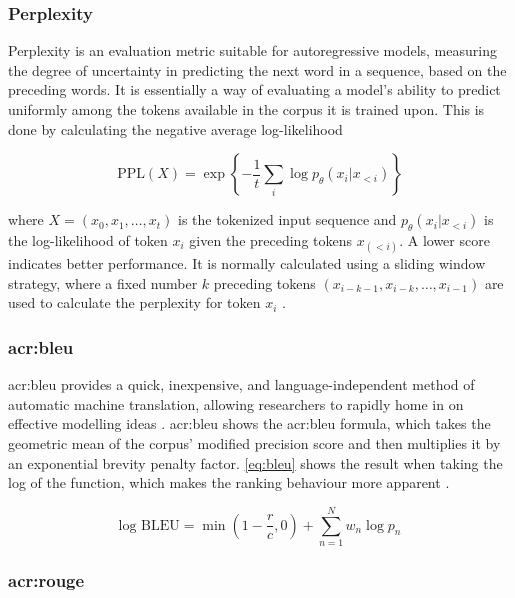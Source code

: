 \subsubsection{Perplexity}

Perplexity is an evaluation metric suitable for autoregressive models, measuring the degree of uncertainty in predicting the next word in a sequence, based on the preceding words. It is essentially a way of evaluating a model's ability to predict uniformly among the tokens available in the corpus it is trained upon. This is done by calculating the negative average log-likelihood

\begin{equation}
    \text{PPL}(X) = \exp \left\{ -\frac{1}{t} \sum_{i} \log p_\theta(x_i | x_{<i}) \right\}
    \label{eq:ppl}
\end{equation}

\noindent where $X = (x_0, x_1, \ldots, x_t)$ is the tokenized input sequence and $p_\theta(x_i | x_{<i})$ is the log-likelihood of token $x_i$ given the preceding tokens $x_(<i)$. A lower score indicates better performance. It is normally calculated using a sliding window strategy, where a fixed number $k$ preceding tokens $(x_{i-k-1},x_{i-k},\ldots,x_{i-1})$ are used to calculate the perplexity for token $x_i$ \citep{huggingfacePerplexityFixedlengthModels}.

\subsubsection[BiLingual Evaluation Understudy]{\acrfull{acr:bleu}}

\gls{acr:bleu} provides a quick, inexpensive, and language-independent method of automatic machine translation, allowing researchers to rapidly home in on effective modelling ideas \citep{papineniBleuMethodAutomatic2002}. \gls{acr:bleu} shows the \gls{acr:bleu} formula, which takes the geometric mean of the corpus' modified precision score and then multiplies it by an exponential brevity penalty factor. \eqref{eq:bleu} shows the result when taking the log of the function, which makes the ranking behaviour more apparent \citep[5]{papineniBleuMethodAutomatic2002}.

\begin{equation}
    \text{log BLEU} = \min\left(1 - \frac{r}{c}, 0\right) + \sum_{n=1}^{N} w_n \log p_n
    \label{eq:bleu}
\end{equation}

\subsubsection[Recall-Oriented Understudy (ROUGE)]{\acrfull{acr:rouge}}

